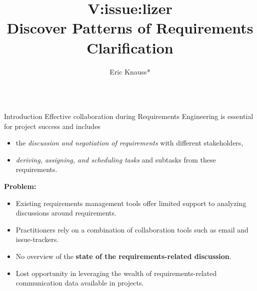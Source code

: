 \documentclass[final]{beamer} %
\title[Vissuelizer]{V:issue:lizer\\Discover Patterns of Requirements Clarification}
\author[Knauss]{Eric Knauss*}
\institute[University of Victoria]{University of Victoria, Canada\\ \vspace{2ex} {\footnotesize *) In collaboration with Daniela Damian and Jane Cleland-Huang}}
\newcommand{\marker}[1]{\textbf{\color{knaccentcolor1} #1}}
\begin{document}
  
\begin{frame}{} 
\vspace{-0.4cm}
\begin{columns}[t]

  \begin{column}{.45\linewidth}
  
  
    \begin{block}{Introduction}
Effective collaboration during Requirements Engineering is essential for project success and %
includes 
\begin{itemize}
\item the \emph{discussion and negotiation of requirements} with different stakeholders,
\item \emph{deriving, assigning, and scheduling tasks} and subtasks from these requirements. 
\end{itemize}

\textbf{Problem:} 
\begin{itemize}
\item Existing requirements management tools offer limited support to analyzing discussions around requirements.
\item Practitioners rely on a combination of collaboration tools such as email and issue-trackers. 
\item No overview of the  \marker{state of the requirements-related discussion}.
\item Lost opportunity in leveraging the wealth of requirements-related communication data available in projects.
\end{itemize}
    \end{block}
    
    
     
    

\end{column}
\end{columns}
\end{frame}
\end{document}
